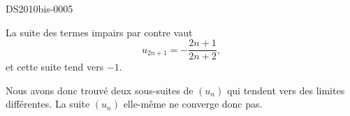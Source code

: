 \begin{corrige}{DS2010bis-0005}
\begin{enumerate}
			La suite des termes impairs par contre vaut
			\begin{equation}
				u_{2n+1}=-\frac{ 2n+1 }{ 2n+2 },
			\end{equation}
			et cette suite tend vers $-1$.

			Nous avons donc trouvé deux sous-suites de $(u_n)$ qui tendent vers des limites différentes. La suite $(u_n)$ elle-même ne converge donc pas.
	\end{enumerate}

\end{corrige}